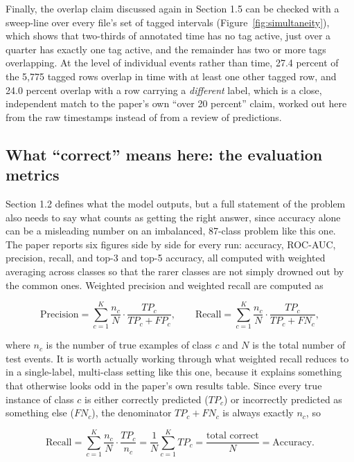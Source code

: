 \documentclass[11pt]{article}
\begin{document}
Finally, the overlap claim discussed again in Section 1.5 can be checked with a sweep-line over every file's set of tagged intervals (Figure~\ref{fig:simultaneity}), which shows that two-thirds of annotated time has no tag active, just over a quarter has exactly one tag active, and the remainder has two or more tags overlapping. At the level of individual events rather than time, 27.4 percent of the 5{,}775 tagged rows overlap in time with at least one other tagged row, and 24.0 percent overlap with a row carrying a \emph{different} label, which is a close, independent match to the paper's own ``over 20 percent'' claim, worked out here from the raw timestamps instead of from a review of predictions.

\subsection{What ``correct'' means here: the evaluation metrics}

Section 1.2 defines what the model outputs, but a full statement of the problem also needs to say what counts as getting the right answer, since accuracy alone can be a misleading number on an imbalanced, 87-class problem like this one. The paper reports six figures side by side for every run: accuracy, ROC-AUC, precision, recall, and top-3 and top-5 accuracy, all computed with weighted averaging across classes so that the rarer classes are not simply drowned out by the common ones. Weighted precision and weighted recall are computed as

\begin{equation}
\text{Precision} = \sum_{c=1}^{K} \frac{n_c}{N} \cdot \frac{TP_c}{TP_c + FP_c}, \qquad
\text{Recall} = \sum_{c=1}^{K} \frac{n_c}{N} \cdot \frac{TP_c}{TP_c + FN_c},
\end{equation}

where $n_c$ is the number of true examples of class $c$ and $N$ is the total number of test events. It is worth actually working through what weighted recall reduces to in a single-label, multi-class setting like this one, because it explains something that otherwise looks odd in the paper's own results table. Since every true instance of class $c$ is either correctly predicted ($TP_c$) or incorrectly predicted as something else ($FN_c$), the denominator $TP_c + FN_c$ is always exactly $n_c$, so

\begin{equation}
\text{Recall} = \sum_{c=1}^{K} \frac{n_c}{N} \cdot \frac{TP_c}{n_c} = \frac{1}{N}\sum_{c=1}^{K} TP_c = \frac{\text{total correct}}{N} = \text{Accuracy}.
\end{equation}
\end{document}
